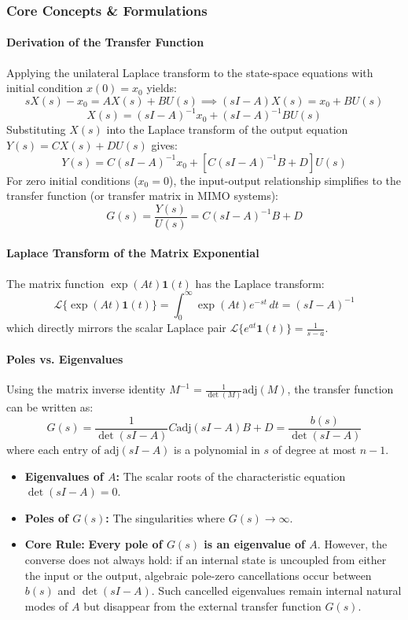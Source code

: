 \documentclass[12pt,onecolumn,twoside ]{article}
\begin{document}
	\subsubsection{Core Concepts \& Formulations}
	\paragraph{Derivation of the Transfer Function}
	Applying the unilateral Laplace transform to the state-space equations with initial condition $x(0) = x_0$ yields: \[
	sX(s) - x_0 = AX(s) + BU(s) \implies (sI - A)X(s) = x_0 + BU(s)
	\] \[
	X(s) = (sI - A)^{-1}x_0 + (sI - A)^{-1}BU(s)
	\]
	Substituting $X(s)$ into the Laplace transform of the output equation $Y(s) = CX(s) + DU(s)$ gives: \[
	Y(s) = C(sI - A)^{-1}x_0 + \left[ C(sI - A)^{-1}B + D \right] U(s)
	\]
	For zero initial conditions ($x_0 = 0$), the input-output relationship simplifies to the transfer function (or transfer matrix in MIMO systems): \[
	G(s) = \frac{Y(s)}{U(s)} = C(sI - A)^{-1}B + D
	\]
	\paragraph{Laplace Transform of the Matrix Exponential}
	The matrix function $\exp(At)\mathbf{1}(t)$ has the Laplace transform: \[
	\mathcal{L}\{\exp(At)\mathbf{1}(t)\} = \int_{0}^{\infty} \exp(At)e^{-st} \, dt = (sI - A)^{-1}
	\] which directly mirrors the scalar Laplace pair $\mathcal{L}\{e^{at}\mathbf{1}(t)\} = \frac{1}{s - a}$.
	\paragraph{Poles vs. Eigenvalues}
	Using the matrix inverse identity $M^{-1} = \frac{1}{\det(M)} \text{adj}(M)$, the transfer function can be written as: \[
	G(s) = \frac{1}{\det(sI - A)} C \text{adj}(sI - A) B + D = \frac{b(s)}{\det(sI - A)}
	\] where each entry of $\text{adj}(sI - A)$ is a polynomial in $s$ of degree at most $n - 1$.
	\begin{itemize}
		\item
		\textbf{Eigenvalues of $A$:} The scalar roots of the characteristic equation $\det(sI - A) = 0$.
		\item
		\textbf{Poles of $G(s)$:} The singularities where $G(s) \to \infty$.
		\item
		\textbf{Core Rule:} \textbf{Every pole of $G(s)$ is an eigenvalue of $A$}. However, the converse does not always hold: if an internal state is uncoupled from either the input or the output, algebraic pole-zero cancellations occur between $b(s)$ and $\det(sI - A)$. Such cancelled eigenvalues remain internal natural modes of $A$ but disappear from the external transfer function $G(s)$.
	\end{itemize}
	
\end{document}
